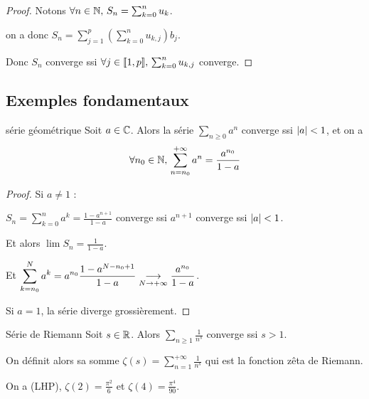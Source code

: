 \begin{proof}
    Notons $\forall n \in \mathbb{N}, \, S_n = \sum_{k=0}^n u_k$. 

    on a donc $\displaystyle S_n = \sum_{j=1}^p \left( \sum_{k = 0}^{n} u_{k, j} \right) b_j$. 

    Donc $S_n$ converge ssi $\forall j \in [\![1, p]\!], \, \sum_{k=0}^n u_{k, j}$ converge.
\end{proof}

\subsection{Exemples fondamentaux}

\begin{theoreme}{série géométrique}{}
    Soit $a \in \mathbb{C}$. Alors la série $\sum_{n \geqslant 0} a^n$ converge ssi $\left|a\right| < 1$, 
    et on a $$\forall n_0 \in \mathbb{N}, \, \sum_{n = n_0}^{+ \infty} a^n = \frac{a^{n_0}}{1 - a}$$
\end{theoreme}


\begin{proof}
    Si $a \neq 1$ : 

    $\displaystyle S_n = \sum_{k = 0}^{n } a^k = \frac{1 - a^{n+1}}{1 - a}$ converge ssi 
    $a^{n+1} $ converge ssi $\left|a\right| < 1$.

    Et alors $\lim S_n = \frac{1}{1 - a}$.

    Et $\displaystyle \sum_{k = n_0 }^{N} a^k = a^{n_0} \frac{1 - a^{N - n_0 + 1}}{1 - a} \underset{N \to + \infty}{\longrightarrow} \frac{a^{n_0}}{1 - a}$.

    Si $a = 1$, la série diverge grossièrement.
\end{proof}

\begin{theoreme}{Série de Riemann}{}
    Soit $s \in \mathbb{R}$. Alors $\displaystyle \sum_{n \geqslant 1} \frac{1}{n^s}$ converge ssi $s > 1$.

    On définit alors sa somme $\displaystyle \zeta(s) = \sum_{n = 1}^{+\infty} \frac{1}{n^s}$ qui est la fonction zêta de Riemann.
    
    On a (LHP), $\zeta(2) = \frac{\pi^2}{6}$ et $\zeta(4) = \frac{\pi^4}{90}$.
\end{theoreme}


